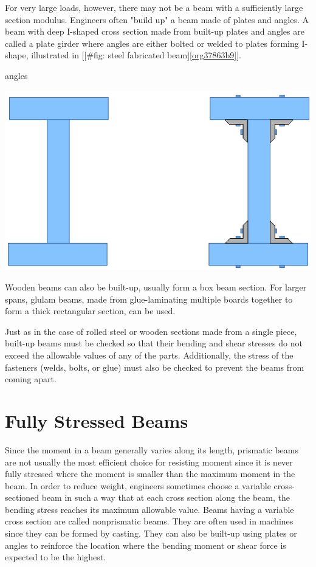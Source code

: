 \documentclass[a4paper,openany,12pt]{book}
\begin{document}
{{For very large loads, however, there may not be a beam with a
sufficiently large section modulus. Engineers often "build up" a beam
made of plates and angles. A beam with deep I-shaped cross section made
from built-up plates and angles are called a plate girder where angles
are either bolted or welded to plates forming I-shape, illustrated in
[[\#fig: steel fabricated beam]\ref{org37863b9}].


angles
\begin{center}
\includegraphics[width=.9\linewidth]{pictures/Simple-load-bearing/steel-fab-beams.pdf}
\label{org37863b9}
\end{center}

Wooden beams can also be built-up, usually form a box beam section. For
larger spans, glulam beams, made from glue-laminating multiple boards
together to form a thick rectangular section, can be used.

Just as in the case of rolled steel or wooden sections made from a
single piece, built-up beams must be checked so that their bending and
shear stresses do not exceed the allowable values of any of the parts.
Additionally, the stress of the fasteners (welds, bolts, or glue) must
also be checked to prevent the beams from coming apart.

\section{Fully Stressed Beams}
\label{sec:org5ae1de2}
Since the moment in a beam generally varies along its length, prismatic
beams are not usually the most efficient choice for resisting moment
since it is never fully stressed where the moment is smaller than the
maximum moment in the beam. In order to reduce weight, engineers
sometimes choose a variable cross-sectioned beam in such a way that at
each cross section along the beam, the bending stress reaches its
maximum allowable value. Beams having a variable cross section are
called nonprismatic beams. They are often used in machines since they
can be formed by casting. They can also be built-up using plates or
angles to reinforce the location where the bending moment or shear force
is expected to be the highest.

}}
\end{document}
